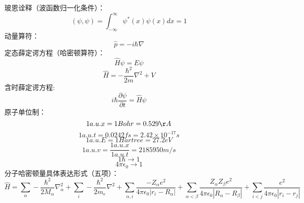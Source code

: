 \documentclass{ctexart}
\begin{document}
玻恩诠释（波函数归一化条件）：
$$(\psi,\psi)=\int^{\infty}_{-\infty}\psi^{*}(x)\psi(x)dx=1$$
动量算符：
$$\hat{p}=-i\hbar\nabla$$
定态薛定谔方程（哈密顿算符）：
$$\hat{H}\psi=E\psi$$
$$\hat{H}=-\frac{\hbar^{2}}{2m}\nabla^{2}+V$$
含时薛定谔方程:
$$i\hbar\frac{\partial\psi}{\partial t}=\hat{H}\psi$$
原子单位制：
$$1a.u.x=1Bohr=0.529\r A$$
$$1a.u.t=0.0242fs=2.42\times10^{-17}s$$
$$1a.u.E=1Hartree=27.2eV$$
$$1a.u.v=\frac{1a.u.x}{1a.u.t}=2185950m/s$$
$$1\hbar\rightarrow1$$
$$4\pi\epsilon_{0}\rightarrow1$$
分子哈密顿量具体表达形式（五项）：
$$\hat{H}=\sum_{\alpha}-\frac{\hbar^{2}}{2M_{\alpha}}\nabla^{2}_{\alpha}+\sum_{i}-\frac{\hbar^{2}}{2m_{e}}
\nabla^{2}+\sum_{\alpha,i}\frac{-Z_{\alpha}e^2}{4\pi\epsilon_0|r_i-R_\alpha|}+
\sum_{\alpha<\beta}\frac{Z_\alpha Z_\beta e^2}{4\pi\epsilon_0|R_\alpha-R_\beta|}+
\sum_{i<j}\frac{e^2}{4\pi\epsilon_0|r_i-r_j|}$$
\end{document}
